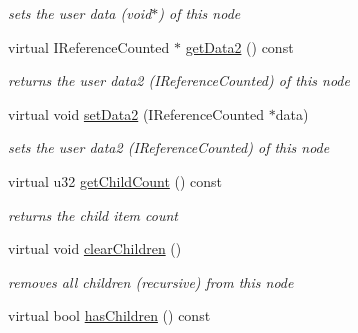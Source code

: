 \begin{DoxyCompactItemize}
\begin{DoxyCompactList}\small\item\em sets the user data (void$\ast$) of this node \end{DoxyCompactList}\item 
\hypertarget{classirr_1_1gui_1_1_c_g_u_i_tree_view_node_add3c556b2aef3d22636a818ede39a13b}{virtual I\-Reference\-Counted $\ast$ \hyperlink{classirr_1_1gui_1_1_c_g_u_i_tree_view_node_add3c556b2aef3d22636a818ede39a13b}{get\-Data2} () const }\label{classirr_1_1gui_1_1_c_g_u_i_tree_view_node_add3c556b2aef3d22636a818ede39a13b}

\begin{DoxyCompactList}\small\item\em returns the user data2 (I\-Reference\-Counted) of this node \end{DoxyCompactList}\item 
\hypertarget{classirr_1_1gui_1_1_c_g_u_i_tree_view_node_aa597b2385e6263be910a051c8703ca6c}{virtual void \hyperlink{classirr_1_1gui_1_1_c_g_u_i_tree_view_node_aa597b2385e6263be910a051c8703ca6c}{set\-Data2} (I\-Reference\-Counted $\ast$data)}\label{classirr_1_1gui_1_1_c_g_u_i_tree_view_node_aa597b2385e6263be910a051c8703ca6c}

\begin{DoxyCompactList}\small\item\em sets the user data2 (I\-Reference\-Counted) of this node \end{DoxyCompactList}\item 
\hypertarget{classirr_1_1gui_1_1_c_g_u_i_tree_view_node_aa4f103c89f34799c6b761cb1a1cb13ca}{virtual u32 \hyperlink{classirr_1_1gui_1_1_c_g_u_i_tree_view_node_aa4f103c89f34799c6b761cb1a1cb13ca}{get\-Child\-Count} () const }\label{classirr_1_1gui_1_1_c_g_u_i_tree_view_node_aa4f103c89f34799c6b761cb1a1cb13ca}

\begin{DoxyCompactList}\small\item\em returns the child item count \end{DoxyCompactList}\item 
\hypertarget{classirr_1_1gui_1_1_c_g_u_i_tree_view_node_a3248716ac670e63c17487a6a3c4652f4}{virtual void \hyperlink{classirr_1_1gui_1_1_c_g_u_i_tree_view_node_a3248716ac670e63c17487a6a3c4652f4}{clear\-Children} ()}\label{classirr_1_1gui_1_1_c_g_u_i_tree_view_node_a3248716ac670e63c17487a6a3c4652f4}

\begin{DoxyCompactList}\small\item\em removes all children (recursive) from this node \end{DoxyCompactList}\item 
\hypertarget{classirr_1_1gui_1_1_c_g_u_i_tree_view_node_a0c142666ec3081aad6187a7d69c8f9e7}{virtual bool \hyperlink{classirr_1_1gui_1_1_c_g_u_i_tree_view_node_a0c142666ec3081aad6187a7d69c8f9e7}{has\-Children} () const }\label{classirr_1_1gui_1_1_c_g_u_i_tree_view_node_a0c142666ec3081aad6187a7d69c8f9e7}


\end{DoxyCompactItemize}

